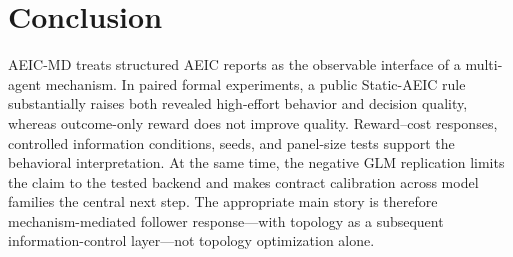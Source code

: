 \section{Conclusion}
\label{sec:conclusion}

AEIC-MD treats structured AEIC reports as the observable interface of a multi-agent mechanism.  In paired formal experiments, a public Static-AEIC rule substantially raises both revealed high-effort behavior and decision quality, whereas outcome-only reward does not improve quality.  Reward--cost responses, controlled information conditions, seeds, and panel-size tests support the behavioral interpretation.  At the same time, the negative GLM replication limits the claim to the tested backend and makes contract calibration across model families the central next step.  The appropriate main story is therefore mechanism-mediated follower response---with topology as a subsequent information-control layer---not topology optimization alone.
